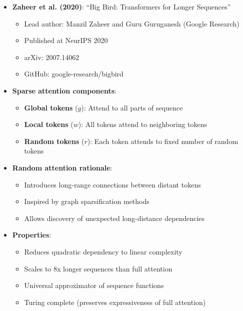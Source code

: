 \documentclass[11pt,letterpaper]{article}
\begin{document}
\begin{itemize}[leftmargin=*]
    \item \textbf{Zaheer et al. (2020)}: ``Big Bird: Transformers for Longer Sequences''
    \begin{itemize}
        \item Lead author: Manzil Zaheer and Guru Guruganesh (Google Research)
        \item Published at NeurIPS 2020
        \item arXiv: 2007.14062
        \item GitHub: google-research/bigbird
    \end{itemize}

    \item \textbf{Sparse attention components}:
    \begin{itemize}
        \item \textbf{Global tokens} ($g$): Attend to all parts of sequence
        \item \textbf{Local tokens} ($w$): All tokens attend to neighboring tokens
        \item \textbf{Random tokens} ($r$): Each token attends to fixed number of random tokens
    \end{itemize}

    \item \textbf{Random attention rationale}:
    \begin{itemize}
        \item Introduces long-range connections between distant tokens
        \item Inspired by graph sparsification methods
        \item Allows discovery of unexpected long-distance dependencies
    \end{itemize}

    \item \textbf{Properties}:
    \begin{itemize}
        \item Reduces quadratic dependency to linear complexity
        \item Scales to 8x longer sequences than full attention
        \item Universal approximator of sequence functions
        \item Turing complete (preserves expressiveness of full attention)
    \end{itemize}
\end{itemize}
\end{document}
